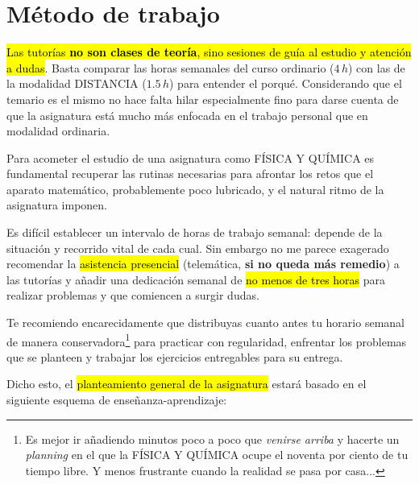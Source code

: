 \documentclass[a5paper,12pt]{extarticle}
\begin{document}
\section{Método de trabajo}

\hl{Las tutorías \textbf{no son clases de teor\'ia}, sino sesiones de gu\'ia al estudio y atenci\'on a dudas}. Basta comparar las horas semanales del curso ordinario ($4\,h$) con las de la modalidad {\footnotesize DISTANCIA} ($1.5\,h$) para entender el porqué. Considerando que el temario es el mismo no hace falta hilar especialmente fino para darse cuenta de que la asignatura está mucho más enfocada en el trabajo personal que en modalidad ordinaria. 

Para acometer el estudio de una asignatura como {\footnotesize FÍSICA Y QUÍMICA} es   fundamental recuperar las rutinas necesarias para afrontar los retos que el aparato matemático, probablemente poco lubricado, y el natural ritmo de la asignatura imponen. 

Es difícil establecer un intervalo de horas de trabajo semanal: depende de la situación y recorrido vital de cada cual. Sin embargo no me parece exagerado recomendar la \hl{asistencia presencial} (telem\'atica, \textbf{si no queda más remedio}) a las tutor\'ias y añadir una dedicaci\'on semanal de \hl{no menos de tres horas} para realizar problemas y que comiencen a surgir dudas.

\vspace{1ex}

Te recomiendo encarecidamente que distribuyas cuanto antes tu horario semanal de manera conservadora\footnote{Es mejor ir añadiendo minutos poco a poco que \textit{venirse arriba} y hacerte un \textit{planning} en el que la {\scriptsize FÍSICA Y QUÍMICA} ocupe el noventa por ciento de tu tiempo libre. Y menos frustrante cuando la realidad se pasa por casa...} para practicar con regularidad, enfrentar los problemas que se planteen y trabajar los ejercicios entregables para su entrega.

\vspace{1ex}

Dicho esto, el \hl{planteamiento general de la asignatura} estar\'a basado en el siguiente esquema de enseñanza-aprendizaje:
\vspace{1ex}
\end{document}
